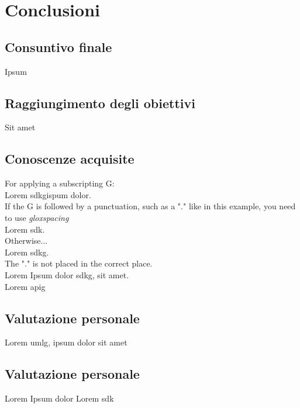 \chapter{Conclusioni}
\label{chap:conclusioni}

\section{Consuntivo finale}
Ipsum

\section{Raggiungimento degli obiettivi}
Sit amet

\section{Conoscenze acquisite}

For applying a subscripting G:\\
Lorem \gls{sdkg}\glox ispum dolor.\\
If the G is followed by a punctuation, such as a "." like in this example, you need to use \textit{gloxspacing}\\
Lorem \gls{sdk}\glox\gloxspacing.\\
Otherwise...\\
Lorem \gls{sdkg}\glox.\\
The "." is not placed in the correct place.\\
Lorem Ipsum dolor \gls{sdkg}\glox\gloxspacing, sit amet.\\
Lorem \gls{apig}

\section{Valutazione personale}
Lorem \gls{umlg}\glox\gloxspacing, ipsum dolor sit amet

\section{Valutazione personale}
Lorem Ipsum dolor Lorem \gls{sdk}

\newpage
